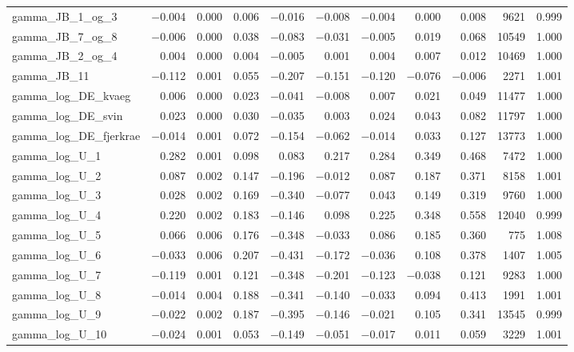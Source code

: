 \documentclass[12pt]{article}
\begin{document}
\begin{longtable}{lrrrrrrrrrr}
gamma\_JB\_1\_og\_3  & $-$0.004 & 0.000 & 0.006 & $-$0.016 & $-$0.008 & $-$0.004 &  0.000 &  0.008 &  9621 & 0.999 \\
gamma\_JB\_7\_og\_8  & $-$0.006 & 0.000 & 0.038 & $-$0.083 & $-$0.031 & $-$0.005 &  0.019 &  0.068 & 10549 & 1.000 \\
gamma\_JB\_2\_og\_4  &  0.004 & 0.000 & 0.004 & $-$0.005 &  0.001 &  0.004 &  0.007 &  0.012 & 10469 & 1.000 \\
gamma\_JB\_11        & $-$0.112 & 0.001 & 0.055 & $-$0.207 & $-$0.151 & $-$0.120 & $-$0.076 & $-$0.006 &  2271 & 1.001 \\
gamma\_log\_DE\_kvaeg   &  0.006 & 0.000 & 0.023 & $-$0.041 & $-$0.008 &  0.007 &  0.021 &  0.049 & 11477 & 1.000 \\
gamma\_log\_DE\_svin    &  0.023 & 0.000 & 0.030 & $-$0.035 &  0.003 &  0.024 &  0.043 &  0.082 & 11797 & 1.000 \\
gamma\_log\_DE\_fjerkrae & $-$0.014 & 0.001 & 0.072 & $-$0.154 & $-$0.062 & $-$0.014 &  0.033 &  0.127 & 13773 & 1.000 \\
gamma\_log\_U\_1  &  0.282 & 0.001 & 0.098 &  0.083 &  0.217 &  0.284 &  0.349 &  0.468 &  7472 & 1.000 \\
gamma\_log\_U\_2  &  0.087 & 0.002 & 0.147 & $-$0.196 & $-$0.012 &  0.087 &  0.187 &  0.371 &  8158 & 1.001 \\
gamma\_log\_U\_3  &  0.028 & 0.002 & 0.169 & $-$0.340 & $-$0.077 &  0.043 &  0.149 &  0.319 &  9760 & 1.000 \\
gamma\_log\_U\_4  &  0.220 & 0.002 & 0.183 & $-$0.146 &  0.098 &  0.225 &  0.348 &  0.558 & 12040 & 0.999 \\
gamma\_log\_U\_5  &  0.066 & 0.006 & 0.176 & $-$0.348 & $-$0.033 &  0.086 &  0.185 &  0.360 &   775 & 1.008 \\
gamma\_log\_U\_6  & $-$0.033 & 0.006 & 0.207 & $-$0.431 & $-$0.172 & $-$0.036 &  0.108 &  0.378 &  1407 & 1.005 \\
gamma\_log\_U\_7  & $-$0.119 & 0.001 & 0.121 & $-$0.348 & $-$0.201 & $-$0.123 & $-$0.038 &  0.121 &  9283 & 1.000 \\
gamma\_log\_U\_8  & $-$0.014 & 0.004 & 0.188 & $-$0.341 & $-$0.140 & $-$0.033 &  0.094 &  0.413 &  1991 & 1.001 \\
gamma\_log\_U\_9  & $-$0.022 & 0.002 & 0.187 & $-$0.395 & $-$0.146 & $-$0.021 &  0.105 &  0.341 & 13545 & 0.999 \\
gamma\_log\_U\_10 & $-$0.024 & 0.001 & 0.053 & $-$0.149 & $-$0.051 & $-$0.017 &  0.011 &  0.059 &  3229 & 1.001 \\

\end{longtable}
\end{document}
